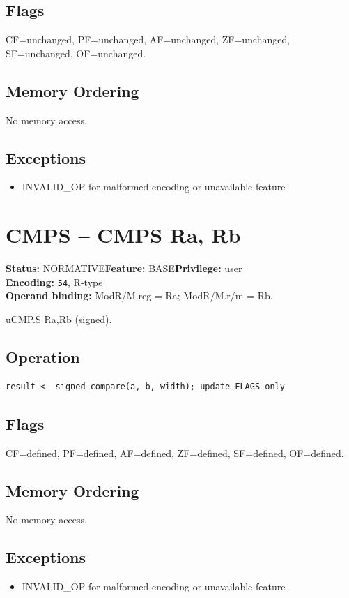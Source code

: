 \documentclass[10pt]{article}
\begin{document}
\subsection*{Flags}
CF=unchanged, PF=unchanged, AF=unchanged, ZF=unchanged, SF=unchanged, OF=unchanged.
\subsection*{Memory Ordering}
No memory access.
\subsection*{Exceptions}
\begin{itemize}
\item INVALID\_OP for malformed encoding or unavailable feature
\end{itemize}
\clearpage

\section{CMPS -- CMPS Ra, Rb}
\textbf{Status:} NORMATIVE\quad \textbf{Feature:} BASE\quad \textbf{Privilege:} user\\
\textbf{Encoding:} \texttt{54}, R-type\\
\textbf{Operand binding:} ModR/M.reg = Ra; ModR/M.r/m = Rb.

uCMP.S Ra,Rb (signed).

\subsection*{Operation}
\begin{lstlisting}
result <- signed_compare(a, b, width); update FLAGS only
\end{lstlisting}
\subsection*{Flags}
CF=defined, PF=defined, AF=defined, ZF=defined, SF=defined, OF=defined.
\subsection*{Memory Ordering}
No memory access.
\subsection*{Exceptions}
\begin{itemize}
\item INVALID\_OP for malformed encoding or unavailable feature
\end{itemize}
\clearpage
\end{document}
